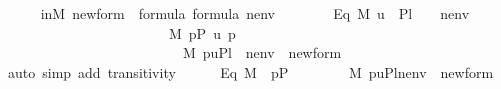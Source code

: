 \begin{isabellebody}
\ \ \ \ \isamarkupfalse%
\ in{\isacharunderscore}{\kern0pt}M\ {\isacartoucheopen}{\isacharquery}{\kern0pt}new{\isacharunderscore}{\kern0pt}form\ {\isasymin}\ formula{\isacartoucheclose}\ {\isacartoucheopen}{\isacharquery}{\kern0pt}{\isasympsi}{\isasymin}formula{\isacartoucheclose}\ {\isacartoucheopen}nenv\ {\isasymin}\ {\isacharunderscore}{\kern0pt}{\isacartoucheclose}\isanewline
\ \ \ \ \isamarkupfalse%
\ Eq{}{\isacharcolon}{\kern0pt}\ {\isachardoublequoteopen}{\isacharparenleft}{\kern0pt}M{\isacharcomma}{\kern0pt}\ {\isacharbrackleft}{\kern0pt}u{\isacharbrackright}{\kern0pt}\ {\isacharat}{\kern0pt}\ {\isacharquery}{\kern0pt}Pl{}\ {\isacharat}{\kern0pt}\ {\isacharbrackleft}{\kern0pt}{\isasympi}{\isacharbrackright}{\kern0pt}\ {\isacharat}{\kern0pt}\ nenv\ {\isasymTurnstile}\ {\isacharquery}{\kern0pt}{\isasympsi}{\isacharparenright}{\kern0pt}\ {\isasymlongleftrightarrow}\ \isanewline
\ \ \ \ \ \ \ \ \ \ \ \ \ \ \ \ \ \ \ \ \ \ \ \ {\isacharparenleft}{\kern0pt}{\isasymexists}{\isasymtheta}{\isasymin}M{\isachardot}{\kern0pt}\ {\isasymexists}p{\isasymin}P{\isachardot}{\kern0pt}\ u\ {\isacharequal}{\kern0pt}{\isasymlangle}{\isasymtheta}{\isacharcomma}{\kern0pt}p{\isasymrangle}\ {\isasymand}\ \isanewline
\ \ \ \ \ \ \ \ \ \ \ \ \ \ \ \ \ \ \ \ \ \ \ \ \ \ M{\isacharcomma}{\kern0pt}\ {\isacharbrackleft}{\kern0pt}{\isasymtheta}{\isacharcomma}{\kern0pt}p{\isacharcomma}{\kern0pt}u{\isacharbrackright}{\kern0pt}{\isacharat}{\kern0pt}{\isacharquery}{\kern0pt}Pl{}{\isacharat}{\kern0pt}{\isacharbrackleft}{\kern0pt}{\isasympi}{\isacharbrackright}{\kern0pt}\ {\isacharat}{\kern0pt}\ nenv\ {\isasymTurnstile}\ {\isacharquery}{\kern0pt}new{\isacharunderscore}{\kern0pt}form{\isacharparenright}{\kern0pt}{\isachardoublequoteclose}\isanewline
\ \ \ \ \ \ \isamarkupfalse%
\ {\isacharparenleft}{\kern0pt}auto\ simp\ add{\isacharcolon}{\kern0pt}\ transitivity{\isacharparenright}{\kern0pt}\isanewline
\ \ \ \ \isamarkupfalse%
\ Eq{}{\isacharcolon}{\kern0pt}\ {\isachardoublequoteopen}{\isasymtheta}{\isasymin}M\ {\isasymLongrightarrow}\ p{\isasymin}P\ {\isasymLongrightarrow}\isanewline
\ \ \ \ \ \ \ {\isacharparenleft}{\kern0pt}M{\isacharcomma}{\kern0pt}\ {\isacharbrackleft}{\kern0pt}{\isasymtheta}{\isacharcomma}{\kern0pt}p{\isacharcomma}{\kern0pt}u{\isacharbrackright}{\kern0pt}{\isacharat}{\kern0pt}{\isacharquery}{\kern0pt}Pl{}{\isacharat}{\kern0pt}{\isacharbrackleft}{\kern0pt}{\isasympi}{\isacharbrackright}{\kern0pt}{\isacharat}{\kern0pt}nenv\ {\isasymTurnstile}\ {\isacharquery}{\kern0pt}new{\isacharunderscore}{\kern0pt}form{\isacharparenright}{\kern0pt}\ {\isasymlongleftrightarrow}\isanewline

\end{isabellebody}
